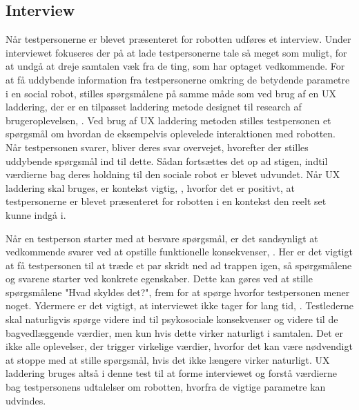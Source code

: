 \subsection{Interview}
\label{ParametreInterview}
%
Når testpersonerne er blevet præsenteret for robotten udføres et interview. Under interviewet fokuseres der på at lade testpersonerne tale så meget som muligt, for at undgå at dreje samtalen væk fra de ting, som har optaget vedkommende. For at få uddybende information fra testpersonerne omkring de betydende parametre i en social robot, stilles spørgsmålene på samme måde som ved brug af en UX laddering, der er en tilpasset laddering metode designet til research af brugeroplevelsen, \parencite[ss. 3-4]{PDF:LadderingUX}. Ved brug af UX laddering metoden stilles testpersonen et spørgsmål om hvordan de eksempelvis oplevelede interaktionen med robotten. Når testpersonen svarer, bliver deres svar overvejet, hvorefter der stilles uddybende spørgsmål ind til dette. Sådan fortsættes det op ad stigen, indtil værdierne bag deres holdning til den sociale robot er blevet udvundet. Når UX laddering skal bruges, er kontekst vigtig, \parencite[s. 3]{PDF:LadderingUX}, hvorfor det er positivt, at testpersonerne er blevet præsenteret for robotten i en kontekst den reelt set kunne indgå i. 

Når en testperson starter med at besvare spørgsmål, er det sandsynligt at vedkommende svarer ved at opstille funktionelle konsekvenser, \parencite[s. 3]{PDF:LadderingUX}. Her er det vigtigt at få testpersonen til at træde et par skridt ned ad trappen igen, så spørgsmålene og svarene starter ved konkrete egenskaber. Dette kan gøres ved at stille spørgsmålene "Hvad skyldes det?", frem for at spørge hvorfor testpersonen mener noget. Ydermere er det vigtigt, at interviewet ikke tager for lang tid, \parencite[s. 4]{PDF:LadderingUX}. Testlederne skal naturligvis spørge videre ind til psykosociale konsekvenser og videre til de bagvedlæggende værdier, men kun hvis dette virker naturligt i samtalen. Det er ikke alle oplevelser, der trigger virkelige værdier, hvorfor det kan være nødvendigt at stoppe med at stille spørgsmål, hvis det ikke længere virker naturligt. \blankline
%
UX laddering bruges altså i denne test til at forme interviewet og forstå værdierne bag testpersonens udtalelser om robotten, hvorfra de vigtige parametre kan udvindes.

